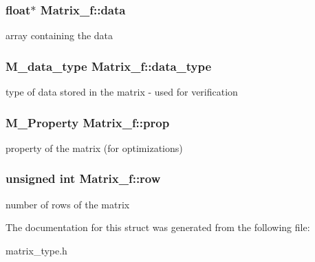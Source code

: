 \subsubsection[{\texorpdfstring{data}{data}}]{\setlength{\rightskip}{0pt plus 5cm}float$\ast$ Matrix\+\_\+f\+::data}\hypertarget{structMatrix__f_aad17369cd1b7acebc55379d862e821c2}{}\label{structMatrix__f_aad17369cd1b7acebc55379d862e821c2}
array containing the data 
\subsubsection[{\texorpdfstring{data\+\_\+type}{data_type}}]{\setlength{\rightskip}{0pt plus 5cm}M\+\_\+data\+\_\+type Matrix\+\_\+f\+::data\+\_\+type}\hypertarget{structMatrix__f_a208178d3dfeaa5adab42b96aff8c97d5}{}\label{structMatrix__f_a208178d3dfeaa5adab42b96aff8c97d5}
type of data stored in the matrix -\/ used for verification 
\subsubsection[{\texorpdfstring{prop}{prop}}]{\setlength{\rightskip}{0pt plus 5cm}M\+\_\+\+Property Matrix\+\_\+f\+::prop}\hypertarget{structMatrix__f_a0f8b87b8012ab2ffa92fbe55b1009d71}{}\label{structMatrix__f_a0f8b87b8012ab2ffa92fbe55b1009d71}
property of the matrix (for optimizations) 
\subsubsection[{\texorpdfstring{row}{row}}]{\setlength{\rightskip}{0pt plus 5cm}unsigned int Matrix\+\_\+f\+::row}\hypertarget{structMatrix__f_a1105833a934acf7f2a07b154c1733acf}{}\label{structMatrix__f_a1105833a934acf7f2a07b154c1733acf}
number of rows of the matrix 

The documentation for this struct was generated from the following file\+:\begin{DoxyCompactItemize}
\item 
matrix\+\_\+type.\+h\end{DoxyCompactItemize}
